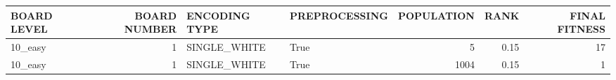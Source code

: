 \begin{tabular}{lrllrrr}
\hline
 BOARD LEVEL   &   BOARD NUMBER & ENCODING TYPE   & PREPROCESSING   &   POPULATION &   RANK &   FINAL FITNESS \\
\hline
 10\_easy       &              1 & SINGLE\_WHITE    & True            &            5 &   0.15 &              17 \\
 10\_easy       &              1 & SINGLE\_WHITE    & True            &         1004 &   0.15 &               1 \\
\hline
\end{tabular}